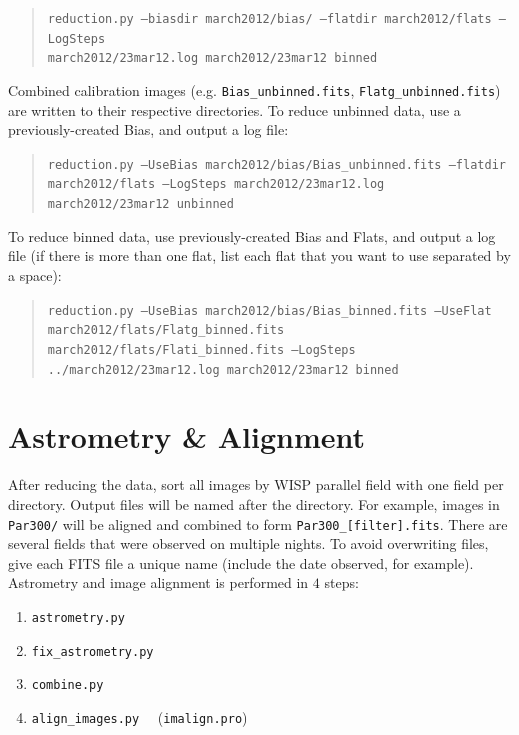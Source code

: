 \documentclass{article}
\newlength{\wideitemsep}
\let\olditem\item
\renewcommand{\item}{\setlength{\itemsep}{\wideitemsep}\olditem}
\begin{document}
\begin{quote}
\texttt{reduction.py --biasdir march2012/bias/ --flatdir march2012/flats 
--LogSteps \\
march2012/23mar12.log march2012/23mar12 binned}
\end{quote}

\noindent Combined calibration images (e.g. \texttt{Bias\_unbinned.fits},
\texttt{Flatg\_unbinned.fits}) are written to their respective directories.
To reduce unbinned data, use a previously-created Bias, and output
a log file:
\begin{quote}
\texttt{reduction.py --UseBias march2012/bias/Bias\_unbinned.fits --flatdir 
march2012/flats --LogSteps march2012/23mar12.log march2012/23mar12 unbinned} \\
\end{quote}

\noindent To reduce binned data, use previously-created Bias and Flats,
and output a log file (if there is more than one flat, list each flat that 
you want to use separated by a space):
\begin{quote}
\texttt{reduction.py --UseBias march2012/bias/Bias\_binned.fits --UseFlat \\
march2012/flats/Flatg\_binned.fits march2012/flats/Flati\_binned.fits 
--LogSteps\\ ../march2012/23mar12.log march2012/23mar12 binned}
\end{quote}


\vspace{3 mm}
\section{Astrometry \& Alignment}
After reducing the data, sort all images by WISP parallel field with
one field per directory. Output files will be named after the directory.
For example, images in \texttt{Par300/} will be aligned and combined
to form \texttt{Par300\_[filter].fits}.
There are several fields that were observed on multiple nights. To avoid 
overwriting files, give each FITS file a unique name 
(include the date observed, for example). \\

\noindent Astrometry and image alignment is performed in $4$ steps:
\begin{enumerate}
\item \texttt{astrometry.py}
\item \texttt{fix\_astrometry.py}
\item \texttt{combine.py}
\item \texttt{align\_images.py} ~~(\texttt{imalign.pro})
\end{enumerate}
\end{document}
